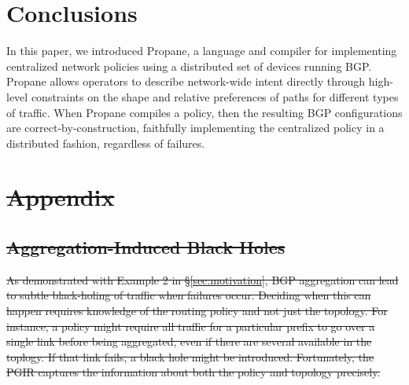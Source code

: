 \documentclass{sig-alternate-10pt}
\newcommand{\sysname}{{\small \sf Propane}\xspace}
\providecommand{\DIFdel}[1]{{\protect\color{red}\sout{#1}}}                      %
\providecommand{\DIFaddend}{} %
\providecommand{\DIFdelbegin}{} %
\begin{document}
\DIFaddend %
%
%

\section{Conclusions}
\label{sec:conclusions}

In this paper, we introduced \sysname, a language and compiler for implementing centralized network policies using a distributed set of devices running BGP. Propane allows operators to describe network-wide intent directly through high-level constraints on the shape and relative preferences of paths for different types of traffic. When \sysname compiles a policy, then the resulting BGP configurations are correct-by-construction, faithfully implementing the centralized policy in a distributed fashion, regardless of failures.



%
%
%
%


\DIFdelbegin \section*{\DIFdel{Appendix}}


\subsection{\DIFdel{Aggregation-Induced Black Holes}}
\addtocounter{subsection}{-1}%


\DIFdel{As demonstrated with Example 2 in \S\ref{sec:motivation}, BGP aggregation can lead to subtle black-holing of traffic when failures occur. Deciding when this can happen requires knowledge of the routing policy and not just the topology. For instance, a policy might require all traffic for a particular prefix to go over a single link before being aggregated, even if there are several available in the toplogy. If that link fails, a black hole might be introduced. Fortunately, the PGIR captures the information about both the policy and topology precisely.
}%
\end{document}
